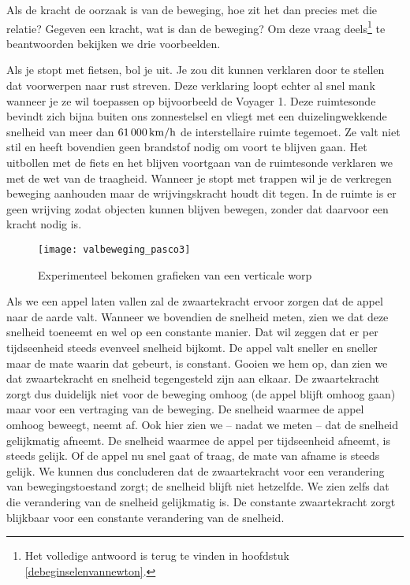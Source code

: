 Als de kracht de oorzaak is van de beweging, hoe zit het dan precies met die relatie? Gegeven een kracht, wat is dan de beweging? Om deze vraag deels\footnote{Het volledige antwoord is terug te vinden in hoofdstuk \ref{debeginselenvannewton}.} te beantwoorden bekijken we drie voorbeelden.

Als je stopt met fietsen, bol je uit. Je zou dit kunnen verklaren door te stellen dat voorwerpen naar rust streven. Deze verklaring loopt echter al snel mank wanneer je ze wil toepassen op bijvoorbeeld de Voyager 1. Deze ruimtesonde bevindt zich bijna buiten ons zonnestelsel en vliegt met een duizelingwekkende snelheid van meer dan $61\,000\rm\,km/h$ de interstellaire ruimte tegemoet. Ze valt niet stil en heeft bovendien geen brandstof nodig om voort te blijven gaan. Het uitbollen met de fiets en het blijven voortgaan van de ruimtesonde verklaren we met de wet van de traagheid. Wanneer je stopt met trappen wil je de verkregen beweging aanhouden maar de wrijvingskracht houdt dit tegen. In de ruimte is er geen wrijving zodat objecten kunnen blijven bewegen, zonder dat daarvoor een kracht nodig is.

\begin{figure}[h]
\centering
\texttt{[image: valbeweging\_pasco3]}
\caption{Experimenteel bekomen grafieken van een verticale worp}
\end{figure}

Als we een appel laten vallen zal de zwaartekracht ervoor zorgen dat de appel naar de aarde valt. Wanneer we bovendien de snelheid meten, zien we dat deze snelheid toeneemt en wel op een constante manier. Dat wil zeggen dat er per tijdseenheid steeds evenveel snelheid bijkomt. De appel valt sneller en sneller maar de mate waarin dat gebeurt, is constant. Gooien we hem op, dan zien we dat zwaartekracht en snelheid tegengesteld zijn aan elkaar. De zwaartekracht zorgt dus duidelijk niet voor de beweging omhoog (de appel blijft omhoog gaan) maar voor een vertraging van de beweging. De snelheid waarmee de appel omhoog beweegt, neemt af. Ook hier zien we -- nadat we meten -- dat de snelheid gelijkmatig afneemt. De snelheid waarmee de appel per tijdseenheid afneemt, is steeds gelijk. Of de appel nu snel gaat of traag, de mate van afname is steeds gelijk. We kunnen dus concluderen dat de zwaartekracht voor een verandering van bewegingstoestand zorgt; de snelheid blijft niet hetzelfde. We zien zelfs dat die verandering van de snelheid gelijkmatig is. De constante zwaartekracht zorgt blijkbaar voor een constante verandering van de snelheid. 


